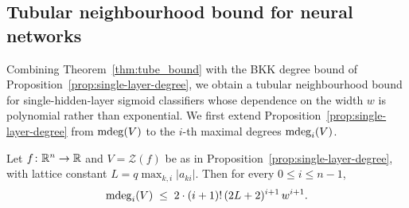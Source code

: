 \subsection{Tubular neighbourhood bound for neural networks}

Combining Theorem~\ref{thm:tube_bound} with the BKK degree bound of Proposition~\ref{prop:single-layer-degree}, we obtain a tubular neighbourhood bound for single-hidden-layer sigmoid classifiers whose dependence on the width $w$ is polynomial rather than exponential.
We first extend Proposition~\ref{prop:single-layer-degree} from $\operatorname{\mathrm{mdeg}}(V)$ to the $i$-th maximal degrees $\operatorname{\mathrm{mdeg}}_i(V)$.

\begin{proposition}\label{prop:single-layer-ideg}
  Let $f\colon\mathbb{R}^n\to\mathbb{R}$ and $V = \mathcal{Z}(f)$ be as in Proposition~\ref{prop:single-layer-degree}, with lattice constant $L=q\max_{k,i}|a_{ki}|$. Then for every $0\le i\le n-1$,
  \begin{equation}\label{eq:single-layer-ideg}
    \operatorname{\mathrm{mdeg}}_i(V) \;\leq\; 2\cdot (i+1)!\,(2L+2)^{i+1}\,w^{i+1}.
  \end{equation}
\end{proposition}

